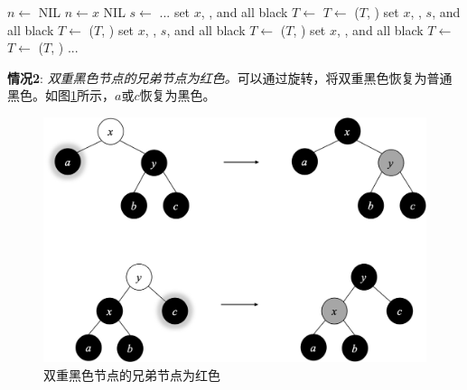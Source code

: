 \documentclass[b5paper]{ctexart}
\begin{document}
\begin{algorithmic}[1]
  \State $n \gets$ NIL
    
    \State $n \gets x$
  \EndIf
   
    \State \Return NIL
  \EndIf
     
        \State $s \gets$ 
        \State ...
            \State set $x$, , and  all black
            \State $T \gets$ 
            \State $T \gets$ ($T$, )
          \Else {}
            \State set $x$, , $s$, and  all black
            \State $T \gets$ ($T$, )
          \EndIf
           
            \State set $x$, , $s$, and  all black
            \State $T \gets$ ($T$, )
          \Else {}
            \State set $x$, , and  all black
            \State $T \gets$ 
            \State $T \gets$ ($T$, )
          \EndIf
        \State ...
        \EndIf
    \EndIf
  \EndWhile
\EndFunction
\end{algorithmic}

\textbf{情况2}: {\em 双重黑色节点的兄弟节点为红色。}可以通过旋转，将双重黑色恢复为普通黑色。如图\cref{fig:del-case2}所示，$a$或$c$恢复为黑色。

\begin{figure}[htbp]
  \centering
  \includegraphics[scale=0.4]{../../../datastruct/tree/red-black-tree/img/del-case3}
  \caption{双重黑色节点的兄弟节点为红色}
  \label{fig:del-case2}
\end{figure}
\end{document}

